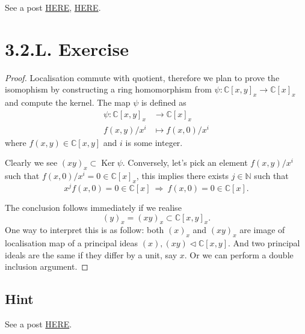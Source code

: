 See a post \href{https://math.stackexchange.com/questions/585201/can-operatornamespecrx-ever-be-finite}{HERE}, \href{https://math.stackexchange.com/questions/496202/operatornamespeckx-has-infinite-points}{HERE}.

\section{3.2.L. Exercise}

\begin{proof}
    Localisation commute with quotient, therefore we plan to prove the isomophism by constructing a ring homomorphism from $\psi:\mathbb C[x,y]_x\to \mathbb C[x]_x$ and compute the kernel. 
    The map $\psi$ is defined as 
    \begin{align*}
        \psi:\mathbb C[x,y]_x &\to \mathbb C[x]_x\\
            f(x,y)/x^i &\mapsto f(x,0)/x^i
    \end{align*}where $f(x,y)\in\mathbb C[x,y]$ and $i$ is some integer. 
    
    Clearly we see $(xy)_x\subset\operatorname{Ker}\psi$. Conversely, let's pick an element $f(x,y)/x^i$ such that $f(x,0)/x^i=0\in \mathbb C[x]_x$, this implies there exists $j\in\mathbb N$ such that 
    \[x^jf(x,0)=0\in\mathbb C[x] ~\Rightarrow~ f(x,0)=0\in\mathbb C[x].\] 

    The conclusion follows immediately if we realise 
    \[(y)_x=(xy)_x\subset \mathbb C[x,y]_x.\]
    One way to interpret this is as follow: both $(x)_x$ and $(xy)_x$ are image of localisation map of a principal ideas $(x),(xy)\triangleleft\mathbb C[x,y]$. And two principal ideals are the same if they differ by a unit, say $x$. Or we can perform a double inclusion argument.
\end{proof}

\subsection{Hint}

See a post \href{https://math.stackexchange.com/questions/3769097/showing-that-mathbbcx-y-xy-x-cong-mathbbcx-x}{HERE}.


